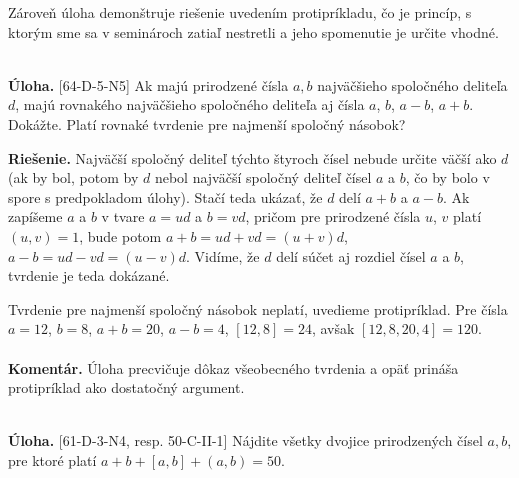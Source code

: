 \documentclass[11pt,a4paper,oneside,final]{book}
\newcommand{\kom}{\textbf{Komentár.} }
\newcommand{\ul}{\textbf{Úloha.} }
\newcommand{\rie}{\textbf{Riešenie.} }
\begin{document}
Zároveň úloha demonštruje riešenie uvedením protipríkladu, čo je princíp, s ktorým sme sa v seminároch zatiaľ nestretli a jeho spomenutie je určite vhodné.\\
\\
\begin{tcolorbox}[breakable,notitle,boxrule=0pt,colback=light-gray,colframe=light-gray]\ul [64-D-5-N5] Ak majú prirodzené čísla $a, b$ najväčšieho spoločného deliteľa $d$, majú rovnakého najväčšieho spoločného deliteľa aj čísla $a$, $b$, $a - b$, $a + b$. Dokážte. Platí rovnaké tvrdenie pre najmenší spoločný násobok?

\end{tcolorbox}

\rie Najväčší spoločný deliteľ týchto štyroch čísel nebude určite väčší ako $d$ (ak by bol, potom by $d$ nebol najväčší spoločný deliteľ čísel $a$ a $b$, čo by bolo v spore s predpokladom úlohy). Stačí teda ukázať, že $d$ delí $a+b$ a $a-b$. Ak zapíšeme $a$ a $b$ v tvare $a=ud$ a $b=vd$, pričom pre prirodzené čísla $u$, $v$ platí $(u,v)=1$, bude potom $a+b=ud+vd=(u+v)d$, $a-b=ud-vd=(u-v)d$. Vidíme, že $d$ delí súčet aj rozdiel čísel $a$ a $b$, tvrdenie je teda dokázané.

Tvrdenie pre najmenší spoločný násobok neplatí, uvedieme protipríklad. Pre čísla $a=12$, $b=8$, $a+b=20$, $a-b=4$, $[12,8]=24$, avšak $[12,8,20,4]=120$.\\
\\
\kom Úloha precvičuje dôkaz všeobecného tvrdenia a opäť prináša protipríklad ako dostatočný argument.\\
\\
\begin{tcolorbox}[breakable,notitle,boxrule=0pt,colback=light-gray,colframe=light-gray]\ul [61-D-3-N4, resp. 50-C-II-1] Nájdite všetky dvojice prirodzených čísel $a, b$, pre ktoré platí $a+b+[a, b]+(a, b) = 50$.

\end{tcolorbox}
\end{document}
